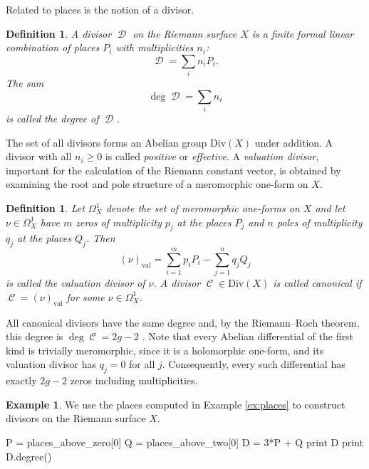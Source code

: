 \documentclass[12pt]{article}
\newtheorem{definition}[theorem]{Definition}
\theoremstyle{definition}
\newtheorem{example}[theorem]{Example}
\DeclareMathOperator{\DivC}{\mathcal{C}}
\DeclareMathOperator{\DivD}{\mathcal{D}}
\begin{document}
Related to places is the notion of a divisor.
\begin{definition} \label{def:divisor}
A divisor $\DivD$ on the Riemann surface $X$ is a finite formal linear
combination of places $P_i$ with multiplicities $n_i$:
\begin{equation}
\DivD = \sum_i n_i P_i.
\end{equation}
The sum
\begin{equation}
\deg \DivD = \sum_i n_i
\end{equation}
is called the degree of $\DivD$.
\end{definition}
The set of all divisors forms an Abelian group $\text{Div}(X)$ under
addition. A divisor with all $n_i \geq 0$ is called {\it positive} or
{\it effective}. A {\it valuation divisor}, important for the
calculation of the Riemann constant vector, is obtained by examining the
root and pole structure of a meromorphic one-form on $X$.
\begin{definition} \label{def:valuationdivisor}
Let $\Omega_X^1$ denote the set of meromorphic one-forms on $X$ and let
$\nu \in \Omega_X^1$ have $m$ zeros of multiplicity $p_j$ at the places
$P_j$ and $n$ poles of multiplicity $q_j$ at the places $Q_j$. Then
\begin{equation} \label{eqn: valuation divisor}
  (\nu)_\text{val} = \sum_{i=1}^m p_iP_i - \sum_{j=1}^n q_jQ_j
\end{equation}
is called the valuation divisor of $\nu$. A divisor $\DivC \in
\text{Div}(X)$ is called {\it canonical} if $\DivC = (\nu)_\text{val}$
for some $\nu \in \Omega_X^1$.
\end{definition}
All canonical divisors have the same degree and, by the Riemann--Roch
theorem, this degree is $\deg \DivC = 2g - 2$ \cite{Springer57}. Note
that every Abelian differential of the first kind is trivially
meromorphic, since it is a holomorphic one-form, and its valuation
divisor has $q_j = 0$ for all $j$. Consequently, every such differential
has exactly $2g-2$ zeros including multiplicities.


\begin{example} \label{ex:divisors} %
We use the places computed in Example \ref{ex:places} to construct
divisors on the Riemann surface $X$.
\begin{ipythoninput}
P = places_above_zero[0]
Q = places_above_two[0]
D = 3*P + Q
print D
print D.degree()
\end{ipythoninput}
\begin{ipythonoutput}
[XXX]
\end{ipythonoutput}
\end{example}
\end{document}
